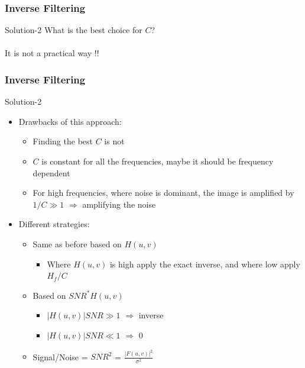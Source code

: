 \documentclass{beamer}
\begin{document}
\begin{frame}
\frametitle{Inverse Filtering}
\begin{block}{Solution-2}
{\color{blue} What is the best choice for $C$?}\\
\\
{\color{blue}It is not a practical way !!}\\
\end{block}
\end{frame}
\begin{frame}
\frametitle{Inverse Filtering}
\begin{block}{Solution-2}
\begin{itemize}
\item Drawbacks of this approach: 
\begin{itemize}
	\item Finding the best $C$ is not 
	\item $C$ is constant for all the frequencies, maybe it should be frequency dependent
	\item For high frequencies, where noise is dominant, the image is amplified by $1/C \gg 1$ $\Rightarrow$ amplifying the noise
\end{itemize}
\item Different strategies:
\begin{itemize}
	\item Same as before based on $H(u,v)$
	\begin{itemize}
		\item Where $H(u,v)$ is high apply the exact inverse, and where low apply $H_{f}/C$
	\end{itemize}	 
	\item Based on $SNR^{\ast}H(u,v)$
	\begin{itemize}
		\item $\vert H(u,v)\vert SNR \gg 1$ $\Rightarrow$ inverse
		\item $\vert H(u,v)\vert SNR \ll 1$ $\Rightarrow$ 0
	\end{itemize}	 
	\item Signal/Noise = $SNR^{2}$ = $\frac{\vert F(u, v) \vert^{2}}{\sigma^{2}}$	
\end{itemize}

\end{itemize}
\end{block}
\end{frame}
\end{document}
